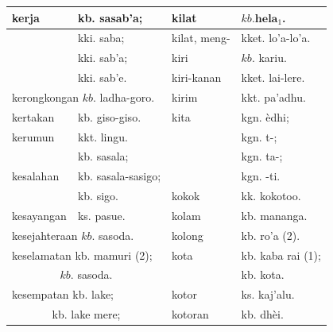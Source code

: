\documentclass[10pt]{article}
\begin{document}
\begin{center}
\begin{tabular}{|l|l|l|l|}
\hline
\multirow[t]{4}{*}{kerja} & kb. sasab'a; & kilat & \(k b . \mathbf{h e l a}_{1}\). \\
\hline
 & kki. saba; & kilat, meng- & kket. lo'a-lo'a. \\
\hline
 & kki. sab'a; & kiri & \(k b\). kariu. \\
\hline
 & kki. sab'e. & kiri-kanan & kket. lai-lere. \\
\hline
\multicolumn{2}{|l|}{kerongkongan \(k b\). ladha-goro.} & kirim & kkt. pa'adhu. \\
\hline
kertakan & kb. giso-giso. & kita & kgn. èdhi; \\
\hline
kerumun & kkt. lingu. &  & kgn. t-; \\
\hline
\multirow[t]{3}{*}{kesalahan} & kb. sasala; &  & kgn. ta-; \\
\hline
 & kb. sasala-sasigo; &  & kgn. -ti. \\
\hline
 & kb. sigo. & kokok & kk. kokotoo. \\
\hline
kesayangan & ks. pasue. & kolam & kb. mananga. \\
\hline
\multicolumn{2}{|l|}{kesejahteraan \(k b\). sasoda.} & kolong & kb. ro'a (2). \\
\hline
\multicolumn{2}{|l|}{keselamatan kb. mamuri (2);} & kota & kb. kaba rai (1); \\
\hline
\multicolumn{2}{|c|}{\(k b\). sasoda.} &  & kb. kota. \\
\hline
\multicolumn{2}{|l|}{kesempatan kb. lake;} & kotor & ks. kaj'alu. \\
\hline
\multicolumn{2}{|c|}{kb. lake mere;} & kotoran & kb. dhèi. \\
\hline
\end{tabular}
\end{center}
\end{document}
